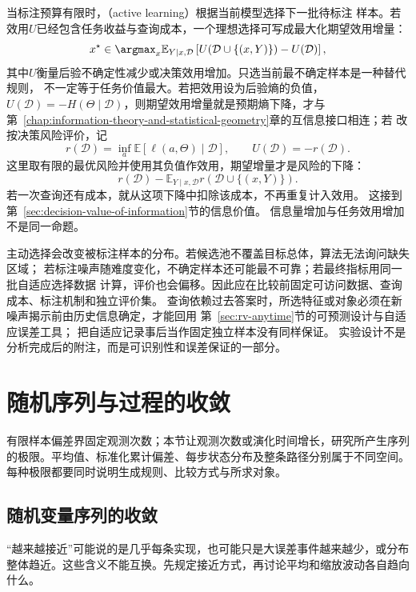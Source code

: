 当标注预算有限时，（active learning）根据当前模型选择下一批待标注
样本。若效用\(U\)已经包含任务收益与查询成本，一个理想选择可写成最大化期望效用增量：
\[
  x^\star\in\argmax_x
  \mathbb{E}_{Y\mid x,\mathcal D}
  \left[
    U(\mathcal D\cup\{(x,Y)\})-U(\mathcal D)
  \right],
\]
其中\(U\)衡量后验不确定性减少或决策效用增加。只选当前最不确定样本是一种替代规则，
不一定等于任务价值最大。若把效用设为后验熵的负值，\(U(\mathcal D)=-H(\Theta\mid\mathcal D)\)，则期望效用增量就是预期熵下降，才与
第~\ref{chap:information-theory-and-statistical-geometry}章的互信息接口相连；若
改按决策风险评价，记
\[
 r(\mathcal D)=\inf_a\mathbb E[\ell(a,\Theta)\mid\mathcal D],
 \qquad U(\mathcal D)=-r(\mathcal D).
\]
这里取有限的最优风险并使用其负值作效用，期望增量才是风险的下降：
\[
 r(\mathcal D)-
 \mathbb E_{Y\mid x,\mathcal D}r(\mathcal D\cup\{(x,Y)\}).
\]
若一次查询还有成本，就从这项下降中扣除该成本，不再重复计入效用。
这接到第~\ref{sec:decision-value-of-information}节的信息价值。
信息量增加与任务效用增加不是同一命题。

主动选择会改变被标注样本的分布。若候选池不覆盖目标总体，算法无法询问缺失区域；
若标注噪声随难度变化，不确定样本还可能最不可靠；若最终指标用同一批自适应选择数据
计算，评价也会偏移。因此应在比较前固定可访问数据、查询成本、标注机制和独立评价集。
查询依赖过去答案时，所选特征或对象必须在新噪声揭示前由历史信息确定，才能回用
第~\ref{sec:rv-anytime}节的可预测设计与自适应误差工具；
把自适应记录事后当作固定独立样本没有同样保证。
实验设计不是分析完成后的附注，而是可识别性和误差保证的一部分。

\section{随机序列与过程的收敛}
\label{sec:rv-sequence-process-convergence}
有限样本偏差界固定观测次数；本节让观测次数或演化时间增长，研究所产生序列的极限。平均值、标准化累计偏差、每步状态分布及整条路径分别属于不同空间。每种极限都要同时说明生成规则、比较方式与所求对象。

\subsection{随机变量序列的收敛}
\label{sec:probability-random-convergence-asymptotics}
“越来越接近”可能说的是几乎每条实现，也可能只是大误差事件越来越少，或分布整体趋近。这些含义不能互换。先规定接近方式，再讨论平均和缩放波动各自趋向什么。

